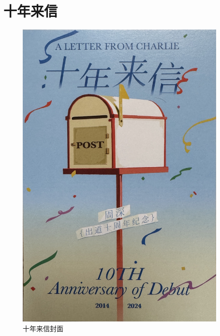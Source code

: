 \documentclass[]{ctexbook}
\begin{document}
\chapter{十年来信}\label{appendix-letter}

\begin{figure}

{\centering \includegraphics[width=300pt]{img/letter-cover} 

}

\caption{十年来信封面}\label{fig:unnamed-chunk-188}
\end{figure}

\newpage
\end{document}
